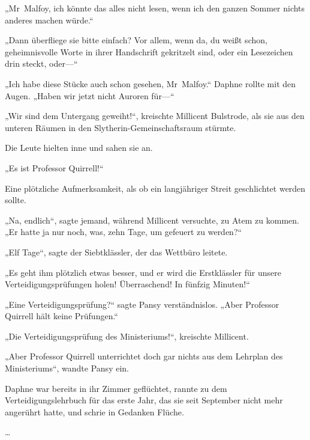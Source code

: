 {„Mr~Malfoy, ich könnte das alles nicht lesen, wenn ich den ganzen Sommer nichts anderes machen würde.“

„Dann überfliege sie bitte einfach? Vor allem, wenn da, du weißt schon, geheimnisvolle Worte in ihrer Handschrift gekritzelt sind, oder ein Lesezeichen drin steckt, oder—“

„Ich habe diese Stücke auch schon gesehen, Mr~Malfoy.“ Daphne rollte mit den Augen. „Haben wir jetzt nicht Auroren für—“

„Wir sind dem Untergang geweiht!“, kreischte Millicent Bulstrode, als sie aus den unteren Räumen in den Slytherin-Gemeinschaftsraum stürmte.

Die Leute hielten inne und sahen sie an.

„Es ist Professor Quirrell!“

Eine plötzliche Aufmerksamkeit, als ob ein langjähriger Streit geschlichtet werden sollte.

„Na, endlich“, sagte jemand, während Millicent versuchte, zu Atem zu kommen. „Er hatte ja nur noch, was, zehn Tage, um gefeuert zu werden?“

„Elf Tage“, sagte der Siebtklässler, der das Wettbüro leitete.

„Es geht ihm plötzlich etwas besser, und er wird die Erstklässler für unsere Verteidigungsprüfungen holen! Überraschend! In fünfzig Minuten!“

„Eine Verteidigungsprüfung?“ sagte Pansy verständnislos. „Aber Professor Quirrell hält keine Prüfungen.“

„Die Verteidigungsprüfung des Ministeriums!“, kreischte Millicent.

„Aber Professor Quirrell unterrichtet doch gar nichts aus dem Lehrplan des Ministeriums“, wandte Pansy ein.

Daphne war bereits in ihr Zimmer geflüchtet, rannte zu dem Verteidigungslehrbuch für das erste Jahr, das sie seit September nicht mehr angerührt hatte, und schrie in Gedanken Flüche.

…

}

